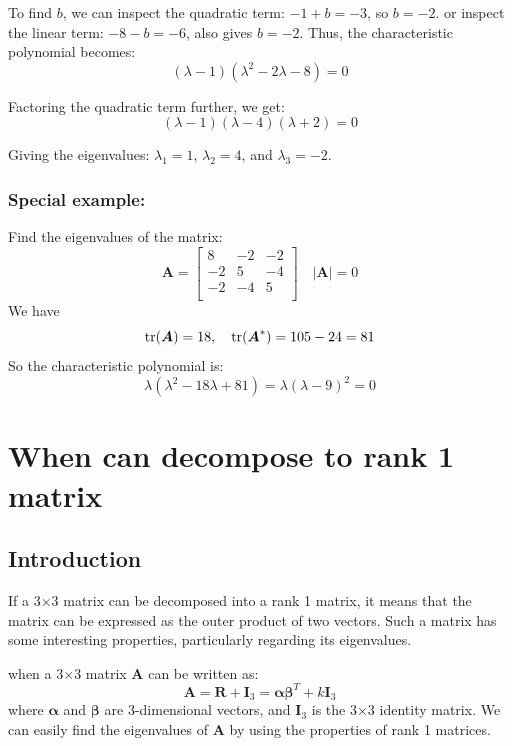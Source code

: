 \documentclass{article}
\begin{document}
To find \( b \), we can inspect the quadratic term: $-1+b=-3$, so $b=-2$. or
inspect the linear term: $-8-b= -6$, also gives $b=-2$. Thus, the characteristic
polynomial becomes:
\[
	(\lambda - 1)(\lambda^2 - 2\lambda - 8) = 0
\]

Factoring the quadratic term further, we get:
\[
	(\lambda - 1)(\lambda - 4)(\lambda + 2) = 0
\]

Giving the eigenvalues: $\lambda_1 = 1$, \( \lambda_2 = 4 \), and \( \lambda_3 = -2 \).

\subsubsection{Special example:} Find the eigenvalues of the matrix:
\[
	\boldsymbol A = \begin{bmatrix}
		8&-2&-2\\
		-2&5&-4\\
		-2&-4&5\\
	\end{bmatrix}
	\quad |\boldsymbol A|=0
\]
We have
\[
	\operatorname{tr}(\boldsymbol A)=18, \quad
	\operatorname{tr}(\boldsymbol{A}^{*})=105-24=81
\]
So the characteristic polynomial is:
\[
	\lambda(\lambda^2 - 18\lambda + 81) = \lambda(\lambda - 9)^2 = 0
\]

\section{When can decompose to rank 1 matrix}

\subsection{Introduction}

If a 3$\times$3 matrix can be decomposed into a rank 1 matrix, it means that the matrix can be expressed as the outer product of two vectors. Such a matrix has some interesting properties, particularly regarding its eigenvalues.

when a 3$\times$3 matrix \( \boldsymbol A \) can be written as:
\[
\boldsymbol A = \boldsymbol R +\boldsymbol I_3 = \boldsymbol\alpha \boldsymbol\beta^{T} + k\boldsymbol I_3
\] 
where \( \boldsymbol\alpha \) and \( \boldsymbol\beta \) are 3-dimensional vectors, and \( \boldsymbol I_3 \) is the 3$\times$3 identity matrix. We can easily find the eigenvalues of \( \boldsymbol A \) by using the properties of rank 1 matrices.
\end{document}
